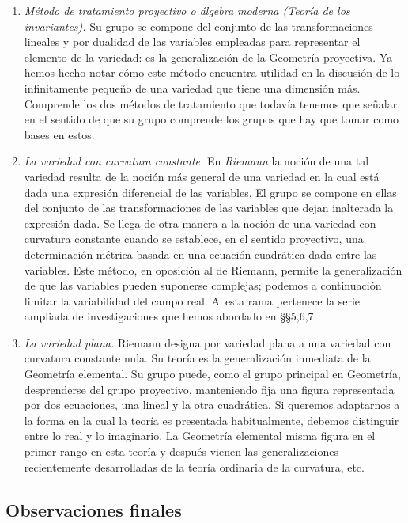 \documentclass[a4paper, 12pt]{article}
\begin{document}
\begin{enumerate}

\item \textit{Método de tratamiento proyectivo o álgebra moderna (Teoría de los invariantes). } Su grupo se compone del conjunto de las transformaciones lineales y por dualidad de las variables empleadas para representar el elemento de la variedad: es la generalización de la Geometría proyectiva. Ya hemos hecho notar cómo este método encuentra utilidad en la discusión de lo infinitamente pequeño de una variedad que tiene una dimensión más. Comprende los dos métodos de tratamiento que todavía tenemos que señalar, en el sentido de que su grupo comprende los grupos que hay que tomar como bases en estos.

\item \textit{La variedad con curvatura constante.} En \textit{Riemann} la noción de una tal variedad resulta de la noción más general de una variedad en la cual está dada una expresión diferencial de las variables. El grupo se compone en ellas del conjunto de las transformaciones de las variables que dejan inalterada la expresión dada. Se llega de otra manera a la noción de una variedad con curvatura constante cuando se establece, en el sentido proyectivo, una determinación métrica basada en una ecuación cuadrática dada entre las variables. Este método, en oposición al de Riemann, permite la generalización de que las variables pueden suponerse complejas; podemos a continuación limitar la variabilidad del campo real. A~esta rama pertenece la serie ampliada de investigaciones que hemos abordado en {\S}{\S}5,6,7.

\item \textit{La variedad plana.} Riemann designa por variedad plana a una variedad con curvatura constante nula. Su teoría es la generalización inmediata de la Geometría elemental. Su grupo puede, como el grupo principal en Geometría, desprenderse del grupo proyectivo, manteniendo fija una figura representada por dos ecuaciones, una lineal y la otra cuadrática. Si queremos adaptarnos a la forma en la cual la teoría es presentada habitualmente, debemos distinguir entre lo real y lo imaginario. La Geometría elemental misma figura en el primer rango en esta teoría y después vienen las generalizaciones recientemente desarrolladas de la teoría ordinaria de la curvatura, etc.

\end{enumerate} 

\subsection*{Observaciones finales}
\end{document}
